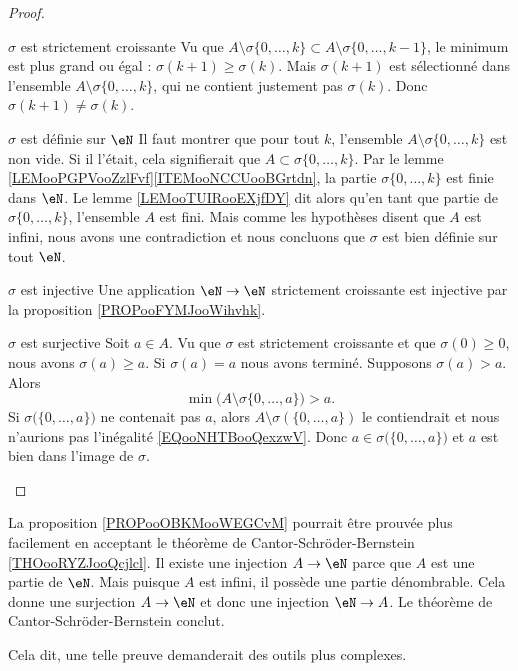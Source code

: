 \begin{proof}
\begin{subproof}
        \item[\( \sigma\) est strictement croissante]
            Vu que \( A\setminus\sigma\{ 0,\ldots, k \}\subset A\setminus\sigma\{ 0,\ldots, k-1 \}\), le minimum est plus grand ou égal : \( \sigma(k+1)\geq \sigma(k)\). Mais \( \sigma(k+1)\) est sélectionné dans l'ensemble \( A\setminus\sigma\{ 0,\ldots, k \}\), qui ne contient justement pas \( \sigma(k)\). Donc \( \sigma(k+1)\neq \sigma(k)\).
        \item[\( \sigma\) est définie sur \( \eN\)]
            Il faut montrer que pour tout \( k\), l'ensemble \( A\setminus\sigma\{ 0,\ldots, k \}\) est non vide. Si il l'était, cela signifierait que \( A\subset \sigma\{ 0,\ldots, k \}\). Par le lemme \ref{LEMooPGPVooZzlFvf}\ref{ITEMooNCCUooBGrtdn}, la partie \( \sigma\{ 0,\ldots, k \}\) est finie dans \( \eN\). Le lemme \ref{LEMooTUIRooEXjfDY} dit alors qu'en tant que partie de \( \sigma\{ 0,\ldots, k \}\), l'ensemble \( A\) est fini. Mais comme les hypothèses disent que \( A\) est infini, nous avons une contradiction et nous concluons que \( \sigma\) est bien définie sur tout \( \eN\).
        \item[\( \sigma\) est injective]
            Une application \( \eN\to \eN\) strictement croissante est injective par la proposition \ref{PROPooFYMJooWihvhk}.
        \item[\( \sigma\) est surjective]
            Soit \( a\in A\). Vu que \( \sigma\) est strictement croissante et que \( \sigma(0)\geq 0\), nous avons \( \sigma(a)\geq a\). Si \( \sigma(a)=a\) nous avons terminé. Supposons \( \sigma(a)>a\). Alors
            \begin{equation}        \label{EQooNHTBooQexzwV}
                \min\big( A\setminus\sigma\{ 0,\ldots, a \} \big)>a.
            \end{equation}
            Si \( \sigma\big( \{ 0,\ldots, a \} \big)\) ne contenait pas \( a\), alors \( A\setminus \sigma(\{ 0,\ldots, a \})\) le contiendrait et nous n'aurions pas l'inégalité \eqref{EQooNHTBooQexzwV}. Donc \( a\in \sigma\big( \{ 0,\ldots, a \} \big)\) et \( a\) est bien dans l'image de \( \sigma\).
    \end{subproof}
\end{proof}

\begin{normaltext}
    La proposition \ref{PROPooOBKMooWEGCvM} pourrait être prouvée plus facilement en acceptant le théorème de Cantor-Schröder-Bernstein \ref{THOooRYZJooQcjlcl}. Il existe une injection \( A\to \eN\) parce que \( A\) est une partie de \( \eN\). Mais puisque \( A\) est infini, il possède une partie dénombrable. Cela donne une surjection \( A\to \eN\) et donc une injection \( \eN\to A\). Le théorème de Cantor-Schröder-Bernstein conclut.

    Cela dit, une telle preuve demanderait des outils plus complexes.
\end{normaltext}


